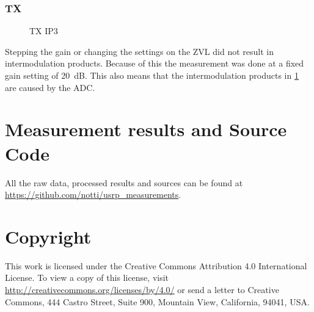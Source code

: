 \documentclass[12pt,a4paper,parskip=full]{scrartcl}
\begin{document}
\subsubsection{TX}
\begin{figure}[htb]
    \centering
{}
    \caption{TX IP3}
    \label{fig:txip3}
\end{figure}
Stepping the gain or changing the settings on the ZVL did not result
in intermodulation products. Because of this the measurement was done
at a fixed gain setting of \SI{20}{\deci\bel}. This also means that
the intermodulation products in \cref{fig:txip3} are caused by the ADC.

\clearpage
\begin{appendix}
\section{Measurement results and Source Code}
\label{sec:sources}
All the raw data, processed results and sources can be found at
\url{https://github.com/notti/usrp_measurements}.
\section*{Copyright}
This work is licensed under the Creative Commons Attribution 4.0 International
License. To view a copy of this license, visit
\url{http://creativecommons.org/licenses/by/4.0/} or send a letter to Creative
Commons, 444 Castro Street, Suite 900, Mountain View, California, 94041, USA.

\printglossary[type=\acronymtype]

\listoffigures



\end{appendix}
\end{document}
